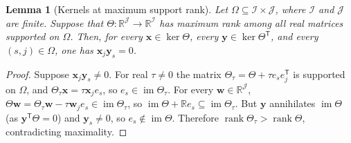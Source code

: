\documentclass[11pt]{article}
\newtheorem{lemma}[theorem]{Lemma}
\theoremstyle{remark}
\DeclareMathOperator{\rank}{rank}
\DeclareMathOperator{\im}{im}
\newcommand{\R}{\mathbb R}
\newcommand{\tr}{\mathsf T}
\begin{document}
\begin{lemma}[Kernels at maximum support rank]\label{lem:kernel-support}
Let $\Omega\subseteq\mathcal I\times\mathcal J$, where $\mathcal I$ and
$\mathcal J$ are finite. Suppose that
$\Theta:\R^{\mathcal J}\to\R^{\mathcal I}$ has maximum rank among all real
matrices supported on $\Omega$. Then, for every $\mathbf x\in\ker\Theta$, every
$\mathbf y\in\ker\Theta^{\tr}$, and every $(s,j)\in\Omega$, one has
$\mathbf x_j\mathbf y_s=0$.
\end{lemma}

\begin{proof}
Suppose $\mathbf x_j\mathbf y_s\ne0$. For real $\tau\neq0$ the matrix
$\Theta_\tau=\Theta+\tau e_se_j^{\tr}$ is supported on $\Omega$, and
$\Theta_\tau\mathbf x=\tau\mathbf x_je_s$, so $e_s\in\im\Theta_\tau$. For every
$\mathbf w\in\R^{\mathcal J}$,
$\Theta\mathbf w=\Theta_\tau\mathbf w-\tau\mathbf w_je_s\in\im\Theta_\tau$, so
$\im\Theta+\R e_s\subseteq\im\Theta_\tau$. But $\mathbf y$ annihilates
$\im\Theta$ (as $\mathbf y^{\tr}\Theta=0$) and $\mathbf y_s\ne0$, so
$e_s\notin\im\Theta$. Therefore $\rank\Theta_\tau>\rank\Theta$, contradicting
maximality.
\end{proof}
\end{document}
